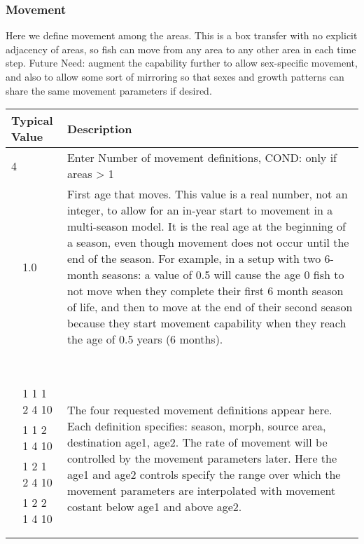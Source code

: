 \subsubsection{Movement}
Here we define movement among the areas.  This is a box transfer with no explicit adjacency of areas, so fish can move from any area to any other area in each time step.  
Future Need:  augment the capability further to allow sex-specific movement, and also to allow some sort of mirroring so that sexes and growth patterns can share the same movement parameters if desired.

\pagebreak
\begin{longtable}{p{0.5cm} p{2cm} p{12cm}}
	\multicolumn{2}{l}{Typical Value} & Description \\
	\hline	
	\multicolumn{2}{l}{4} & \multicolumn{1}{l}{Enter Number of movement definitions, COND:  only if areas > 1}\\
		
		& 1.0 & \multirow{1}{12cm}{First age that moves. This value is a real number, not an integer, to allow for an in-year start to movement in a multi-season model.  It is the real age at the beginning of a season, even though movement does not occur until the end of the season.  For example, in a  setup with two 6-month seasons:  a value of 0.5 will cause the age 0 fish to not move when they complete their first 6 month season of life, and then to move at the end of their second season because they start movement capability when they reach the age of 0.5 years (6 months).} \\ \\ \\ \\ \\ \\ \\ \\ \\
		& 1 1 1 2 4 10 & \multicolumn{1}{l}{\multirow{5}{6cm}{\parbox{12cm}{The four requested movement definitions appear here.  Each definition specifies: season, morph, source area, destination age1, age2. The rate of movement will be controlled by the movement parameters later.  Here the age1 and age2 controls specify the range over which the movement parameters are interpolated with movement costant below age1 and above age2.}}}\\
		& 1 1 2 1 4 10 &  \\
		& 1 2 1 2 4 10 &  \\
		& 1 2 2 1 4 10 &  \\
		\\ \\
		\hline
	\end{longtable}

